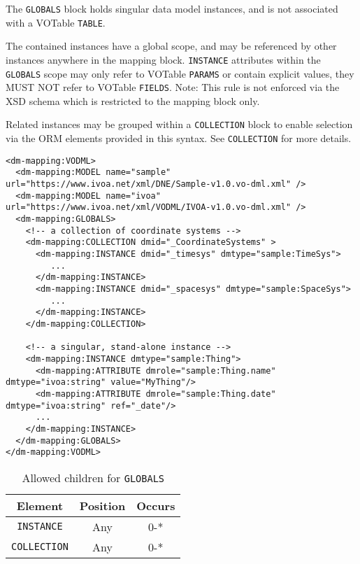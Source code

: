 The \texttt{GLOBALS} block holds singular data model instances, and is not associated 
with a VOTable \texttt{TABLE}.

The contained instances have a global scope, and may be
referenced by other instances anywhere in the mapping block.  \texttt{INSTANCE} attributes
within the \texttt{GLOBALS} scope may only refer to VOTable \texttt{PARAMS} or contain
explicit values, they MUST NOT refer to VOTable \texttt{FIELDS}.  Note: This rule is not enforced
via the XSD schema which is restricted to the mapping block only.

Related instances may be grouped within a \texttt{COLLECTION} block to enable selection
via the ORM elements provided in this syntax.  See \texttt{COLLECTION} for more details.

\begin{lstlisting}[frame=single,caption={Example \texttt{GLOBALS} block},style=XML,basicstyle=\tiny]
<dm-mapping:VODML>
  <dm-mapping:MODEL name="sample" url="https://www.ivoa.net/xml/DNE/Sample-v1.0.vo-dml.xml" />
  <dm-mapping:MODEL name="ivoa"   url="https://www.ivoa.net/xml/VODML/IVOA-v1.0.vo-dml.xml" />
  <dm-mapping:GLOBALS>
    <!-- a collection of coordinate systems -->
    <dm-mapping:COLLECTION dmid="_CoordinateSystems" >
      <dm-mapping:INSTANCE dmid="_timesys" dmtype="sample:TimeSys">
         ...
      </dm-mapping:INSTANCE>
      <dm-mapping:INSTANCE dmid="_spacesys" dmtype="sample:SpaceSys">
         ...
      </dm-mapping:INSTANCE>
    </dm-mapping:COLLECTION>

    <!-- a singular, stand-alone instance -->
    <dm-mapping:INSTANCE dmtype="sample:Thing">
      <dm-mapping:ATTRIBUTE dmrole="sample:Thing.name" dmtype="ivoa:string" value="MyThing"/>
      <dm-mapping:ATTRIBUTE dmrole="sample:Thing.date" dmtype="ivoa:string" ref="_date"/>
      ...
    </dm-mapping:INSTANCE>
  </dm-mapping:GLOBALS>
</dm-mapping:VODML>
\end{lstlisting}


\begin{table}[!htbp]
  \small
  \centering
  \begin{tabulary}{\linewidth}{|c |c |c|}
    \hline 
        \textbf{Element} &
        \textbf{Position} &
        \textbf{Occurs}\\
    \hline
    \hline
        \texttt{INSTANCE} &
        Any &
        0-*\\
    \hline
        \texttt{COLLECTION} &
        Any &
        0-*\\
    \hline
  \end{tabulary}
  \caption{Allowed children for \texttt{GLOBALS}} 
  \label{tbl:globals-children}
 \end{table}
